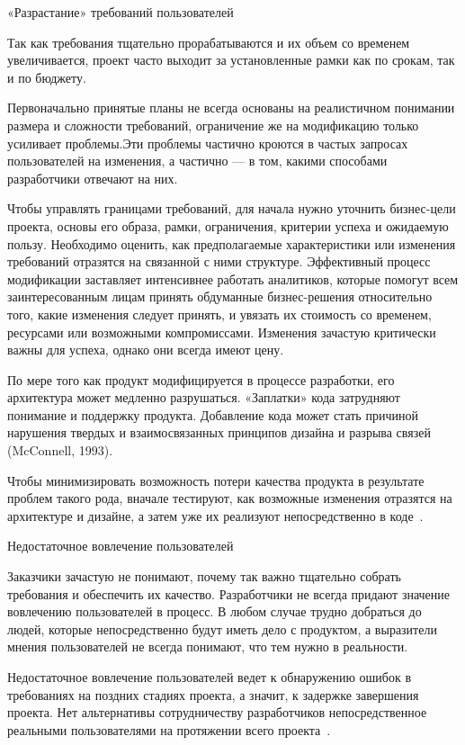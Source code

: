 \documentclass{../industrial-development}
\begin{document}
{\alert{«Разрастание» требований пользователей}

Так как требования тщательно прорабатываются и их объем со временем увеличивается, проект часто выходит за установленные рамки как по срокам, так и по бюджету. 

Первоначально принятые планы не всегда основаны на реалистичном понимании размера и сложности требований, ограничение же на модификацию только усиливает проблемы.Эти проблемы частично кроются в частых запросах пользователей на изменения, а частично — в том, какими способами разработчики отвечают на них.

Чтобы управлять границами требований, для начала нужно уточнить бизнес-цели проекта, основы его образа, рамки, ограничения, критерии успеха и ожидаемую пользу. Необходимо оценить, как предполагаемые характеристики или изменения требований отразятся на связанной с ними структуре. Эффективный процесс модификации заставляет интенсивнее работать аналитиков, которые помогут всем заинтересованным
лицам принять обдуманные бизнес-решения относительно того, какие изменения следует принять, и увязать их стоимость со временем, ресурсами или возможными компромиссами. Изменения зачастую критически важны для успеха, однако они всегда имеют цену.

По мере того как продукт модифицируется в процессе разработки, его архитектура может медленно разрушаться. «Заплатки» кода затрудняют понимание и поддержку продукта. Добавление кода может стать причиной нарушения твердых и взаимосвязанных принципов дизайна и разрыва связей (McConnell, 1993). 

Чтобы минимизировать возможность потери качества продукта в результате проблем такого рода, вначале тестируют, как возможные изменения отразятся на архитектуре и дизайне, а затем уже их реализуют непосредственно
в коде~\cite[с.~17-18]{Wiegers}.

\alert{Недостаточное вовлечение пользователей}

Заказчики зачастую не понимают, почему так важно тщательно собрать требования и обеспечить их качество. Разработчики не всегда придают значение вовлечению пользователей в процесс. В любом случае трудно добраться до
людей, которые непосредственно будут иметь дело с продуктом, а выразители мнения пользователей не всегда понимают, что тем нужно в реальности. 

Недостаточное вовлечение пользователей ведет к обнаружению ошибок в требованиях на поздних стадиях проекта, а значит, к задержке завершения проекта. Нет альтернативы сотрудничеству
разработчиков непосредственное реальными пользователями на протяжении всего проекта~\cite[с.~17]{Wiegers}.


}
\end{document}
